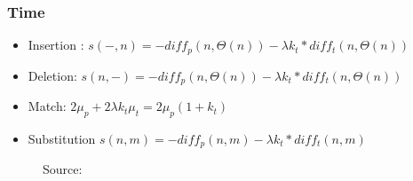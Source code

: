 \documentclass{beamer}
\begin{document}
	\begin{frame}
        \frametitle{Time}
            \begin{itemize}
             \item Insertion : $ s(-, n) = -diff_p(n,\Theta (n)) - \lambda k_t * diff_t(n,\Theta (n))$
             \item Deletion: $s(n, -) = -diff_p(n,\Theta (n)) - \lambda k_t * diff_t(n,\Theta (n))$
             \item Match: $2\mu_p + 2\lambda k_t\mu_t = 2\mu_p(1+k_t)$
             \item Substitution $s(n,m) = -diff_p(n,m) - \lambda k_t * diff_t(n,m)$
            \end{itemize}
            \begin{center}
            \begin{figure}[h!]
             \caption{Source: \cite{five_point_two}}
            \end{figure}
            \end{center}
	\end{frame}
	
\end{document}
